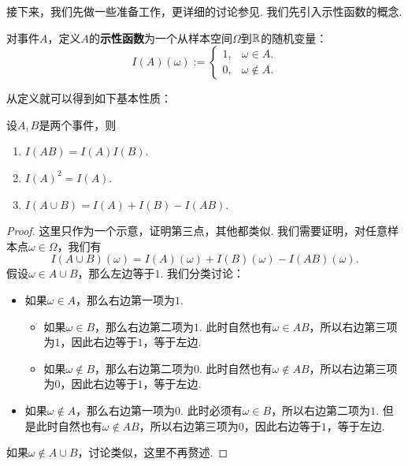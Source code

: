 接下来，我们先做一些准备工作，更详细的讨论参见. 我们先引入示性函数的概念.
\begin{definition}[示性函数]\label{def:indicator-function}
    对事件$A$，定义$A$的\textbf{示性函数}为一个从样本空间$\Omega$到$\mathbb{R}$的随机变量：
\begin{equation*}
    I(A)(\omega) := 
    \begin{cases}
        1,& \omega \in A. \\
        0,& \omega \notin A.
    \end{cases}
\end{equation*}
\end{definition}

从定义就可以得到如下基本性质：
\begin{proposition}\label{prop:indicator-function}
    设$A, B$是两个事件，则
    \begin{enumerate}
        \item $I(AB) = I(A) I(B)$.
        \item $I(A)^2 = I(A)$.
        \item $I(A\cup B) = I(A) +I(B) - I(AB) $.
    \end{enumerate}
\end{proposition}
\begin{proof}
    这里只作为一个示意，证明第三点，其他都类似. 我们需要证明，对任意样本点$\omega\in\Omega$，我们有
    \[
        I(A\cup B)(\omega) = I(A)(\omega) + I(B)(\omega) - I(AB)(\omega).
    \]
    假设$\omega\in A\cup B$，那么左边等于$1$. 我们分类讨论：
    \begin{itemize}
        \item 如果$\omega\in A$，那么右边第一项为$1$.
        \begin{itemize}
            \item 如果$\omega\in B$，那么右边第二项为$1$. 此时自然也有$\omega\in AB$，所以右边第三项为$1$，因此右边等于$1$，等于左边. 
            \item 如果$\omega\notin B$，那么右边第二项为$0$. 此时自然也有$\omega\notin AB$，所以右边第三项为$0$，因此右边等于$1$，等于左边. 
        \end{itemize}
        \item 如果$\omega\notin A$，那么右边第一项为$0$. 此时必须有$\omega\in B$，所以右边第二项为$1$. 但是此时自然也有$\omega\notin AB$，所以右边第三项为$0$，因此右边等于$1$，等于左边. 
    \end{itemize}
    如果$\omega\notin A\cup B$，讨论类似，这里不再赘述. 
\end{proof}

